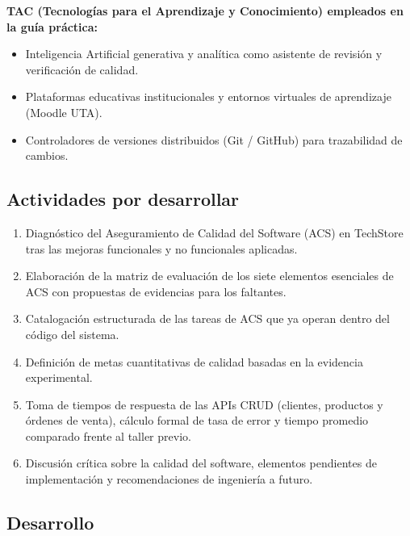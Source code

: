 \documentclass{article}
\begin{document}
\textbf{TAC (Tecnologías para el Aprendizaje y Conocimiento) empleados en la guía práctica:}
\begin{itemize}
    \item[$\boxtimes$] Inteligencia Artificial generativa y analítica como asistente de revisión y verificación de calidad.
    \item[$\boxtimes$] Plataformas educativas institucionales y entornos virtuales de aprendizaje (Moodle UTA).
    \item[$\boxtimes$] Controladores de versiones distribuidos (Git / GitHub) para trazabilidad de cambios.
\end{itemize}

\subsection{Actividades por desarrollar}
\begin{enumerate}
    \item Diagnóstico del Aseguramiento de Calidad del Software (ACS) en TechStore tras las mejoras funcionales y no funcionales aplicadas.
    \item Elaboración de la matriz de evaluación de los siete elementos esenciales de ACS con propuestas de evidencias para los faltantes.
    \item Catalogación estructurada de las tareas de ACS que ya operan dentro del código del sistema.
    \item Definición de metas cuantitativas de calidad basadas en la evidencia experimental.
    \item Toma de tiempos de respuesta de las APIs CRUD (clientes, productos y órdenes de venta), cálculo formal de tasa de error y tiempo promedio comparado frente al taller previo.
    \item Discusión crítica sobre la calidad del software, elementos pendientes de implementación y recomendaciones de ingeniería a futuro.
\end{enumerate}

\newpage

\subsection{Desarrollo}
\end{document}
